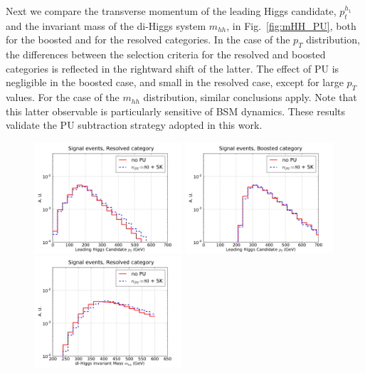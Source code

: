 Next we compare the transverse momentum of the leading Higgs
candidate, $p_t^{h_1}$ and the invariant mass of the di-Higgs system
$m_{hh}$, in Fig.~\ref{fig:mHH_PU}, both for the boosted and
for the resolved categories.
%
In the case of the $p_T$ distribution, the differences between the selection
criteria for the resolved
and boosted categories is reflected in the rightward shift of the latter.
%
The effect of PU is negligible in the boosted case, and small
in the resolved case, except for large $p_T$ values.
%
For the case of the $m_{hh}$ distribution, similar conclusions
apply.
%
Note that this latter observable is particularly sensitive
of BSM dynamics.
%
These results validate the PU subtraction strategy adopted in this work.


\begin{figure}[t]
  \begin{center}
    \vspace{-1cm}
  \includegraphics[width=0.49\textwidth]{plots/pt_H0_C2_res_comp.pdf}
  \includegraphics[width=0.49\textwidth]{plots/pt_H0_C2_bst_comp.pdf}
  \includegraphics[width=0.49\textwidth]{plots/m_HH_C2_res_comp.pdf}

\end{center}
\end{figure}
